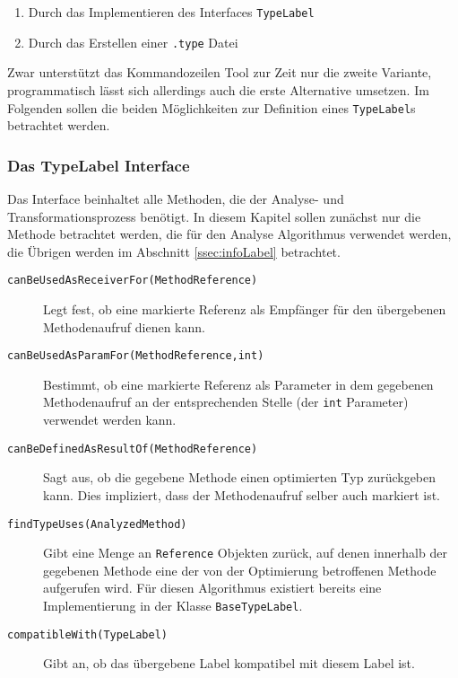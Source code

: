 \begin{enumerate} 
	\item Durch das Implementieren des Interfaces \texttt{TypeLabel}
	\item Durch das Erstellen einer \texttt{.type} Datei
\end{enumerate}

Zwar unterstützt das Kommandozeilen Tool zur Zeit nur die zweite Variante,
programmatisch lässt sich allerdings auch die erste Alternative umsetzen. Im 
Folgenden sollen die beiden Möglichkeiten zur Definition eines \texttt{TypeLabel}s
betrachtet werden.

\subsubsection{Das TypeLabel Interface} \label{sssec:typeLabel}

Das Interface beinhaltet alle Methoden, die der Analyse- und Transformationsprozess
benötigt. In diesem Kapitel sollen zunächst nur die Methode betrachtet werden, die
für den Analyse Algorithmus verwendet werden, die Übrigen werden im Abschnitt 
\ref{ssec:infoLabel} betrachtet. 

\begin{description}
	\item[\texttt{canBeUsedAsReceiverFor(MethodReference)}] Legt fest, ob eine 
	markierte Referenz als Empfänger für den übergebenen Methodenaufruf dienen kann.
	\item[\texttt{canBeUsedAsParamFor(MethodReference,int)}] Bestimmt, ob eine 
	markierte Referenz als Parameter in dem gegebenen Methodenaufruf an der 
	entsprechenden Stelle (der \texttt{int} Parameter) verwendet werden kann.
	\item[\texttt{canBeDefinedAsResultOf(MethodReference)}] Sagt aus, ob die 
	gegebene Methode einen optimierten Typ zurückgeben kann. Dies impliziert, dass
	der Methodenaufruf selber auch markiert ist.
	\item[\texttt{findTypeUses(AnalyzedMethod)}] Gibt eine Menge an \texttt{Reference}
	Objekten zurück, auf denen innerhalb der gegebenen Methode eine der von 
	der Optimierung betroffenen Methode aufgerufen wird. Für diesen Algorithmus 
	existiert bereits eine Implementierung in der Klasse \texttt{BaseTypeLabel}.
	\item[\texttt{compatibleWith(TypeLabel)}] Gibt an, ob das übergebene Label 
	kompatibel mit diesem Label ist.
\end{description}

